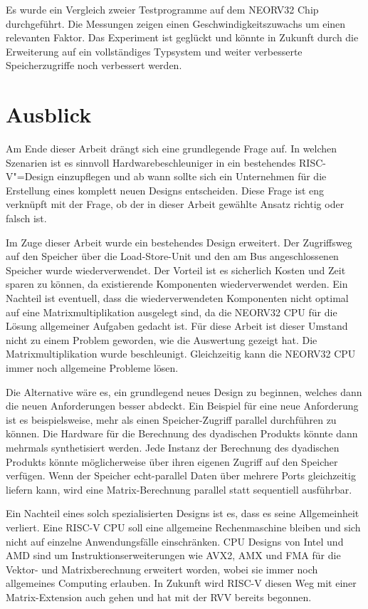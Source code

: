 Es wurde ein Vergleich zweier Testprogramme auf dem NEORV32 Chip durchgeführt. Die Messungen zeigen einen Geschwindigkeitszuwachs um einen relevanten Faktor. Das Experiment ist geglückt und könnte in Zukunft durch die Erweiterung auf ein vollständiges Typsystem und weiter verbesserte Speicherzugriffe noch verbessert werden.



\section{Ausblick} \label{sec:outlook}

Am Ende dieser Arbeit drängt sich eine grundlegende Frage auf. In welchen Szenarien ist es sinnvoll Hardwarebeschleuniger in ein bestehendes RISC-V"=Design einzupflegen und ab wann sollte sich ein Unternehmen für die Erstellung eines komplett neuen Designs entscheiden. Diese Frage ist eng verknüpft mit der Frage, ob der in dieser Arbeit gewählte Ansatz richtig oder falsch ist.

Im Zuge dieser Arbeit wurde ein bestehendes Design erweitert. Der Zugriffsweg auf den Speicher über die Load-Store-Unit und den am Bus angeschlossenen Speicher wurde wiederverwendet. Der Vorteil ist es sicherlich Kosten und Zeit sparen zu können, da existierende Komponenten wiederverwendet werden. Ein Nachteil ist eventuell, dass die wiederverwendeten Komponenten nicht optimal auf eine Matrixmultiplikation ausgelegt sind, da die NEORV32 CPU für die Lösung allgemeiner Aufgaben gedacht ist. Für diese Arbeit ist dieser Umstand nicht zu einem Problem geworden, wie die Auswertung gezeigt hat. Die Matrixmultiplikation wurde beschleunigt. Gleichzeitig kann die NEORV32 CPU immer noch allgemeine Probleme lösen.

Die Alternative wäre es, ein grundlegend neues Design zu beginnen, welches dann die neuen Anforderungen besser abdeckt. Ein Beispiel für eine neue Anforderung ist es beispielsweise, mehr als einen Speicher-Zugriff parallel durchführen zu können. Die Hardware für die Berechnung des dyadischen Produkts könnte dann mehrmals synthetisiert werden. Jede Instanz der Berechnung des dyadischen Produkts könnte möglicherweise über ihren eigenen Zugriff auf den Speicher verfügen. Wenn der Speicher echt-parallel Daten über mehrere Ports gleichzeitig liefern kann, wird eine Matrix-Berechnung parallel statt sequentiell ausführbar.

Ein Nachteil eines solch spezialisierten Designs ist es, dass es seine Allgemeinheit verliert. Eine RISC-V CPU soll eine allgemeine Rechenmaschine bleiben und sich nicht auf einzelne Anwendungsfälle einschränken. CPU Designs von Intel und AMD sind um Instruktionserweiterungen wie AVX2, AMX und FMA für die Vektor- und Matrixberechnung erweitert worden, wobei sie immer noch allgemeines Computing erlauben. In Zukunft wird RISC-V diesen Weg mit einer Matrix-Extension auch gehen und hat mit der \gls{RVV} bereits begonnen.

